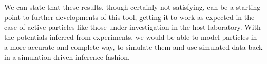 \documentclass[../../master_thesis_np.tex]{subfiles}
\begin{document}
We can state that these results, though certainly not satisfying, can be a starting point to further developments of this tool, getting it to work as expected in the case of active particles like those under investigation in the host laboratory.
With the potentials inferred from experiments, we would be able to model particles in a more accurate and complete way, to simulate them and use simulated data back in a simulation-driven inference fashion.
\end{document}
